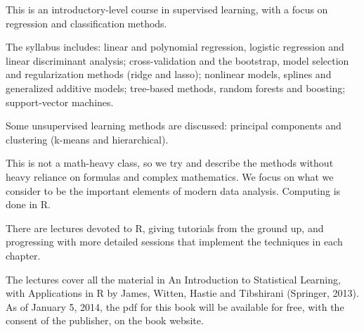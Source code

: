 This is an introductory-level course in supervised learning, with a focus on regression and classification methods. 

The syllabus includes: linear and polynomial regression, logistic regression and linear discriminant analysis; cross-validation and the bootstrap, model selection and regularization methods (ridge and lasso); nonlinear models, splines and generalized additive models; tree-based methods, random forests and boosting; support-vector machines. 

Some unsupervised learning methods are discussed: principal components and clustering (k-means and hierarchical).

This is not a math-heavy class, so we try and describe the methods without heavy reliance on formulas and complex mathematics. We focus on what we consider to be the important elements of modern data analysis. Computing is done in R. 

There are lectures devoted to R, giving tutorials from the ground up, and progressing with more detailed sessions that implement the techniques in each chapter.

The lectures cover all the material in An Introduction to Statistical Learning, with Applications in R by James, Witten, Hastie and Tibshirani (Springer, 2013). As of January 5, 2014, the pdf for this book will be available for free, with the consent of the publisher, on the book website.

